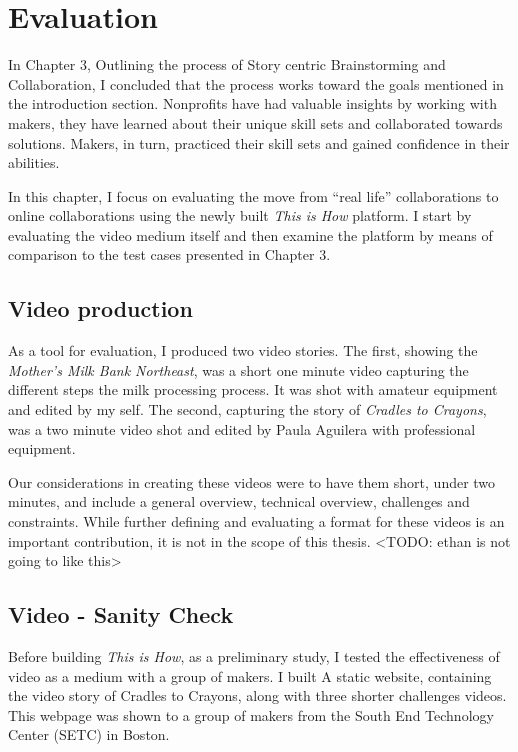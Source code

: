 \chapter{Evaluation}
\label{chap_eval}

In Chapter 3, Outlining the process of Story centric Brainstorming and Collaboration, I concluded that the process works toward the goals mentioned in the introduction section. Nonprofits have had valuable insights by working with makers, they have learned about their unique skill sets and collaborated towards solutions. Makers, in turn, practiced their skill sets and gained confidence in their abilities.

In this chapter, I focus on evaluating the move from ``real life'' collaborations to online collaborations using the newly built \textit{This is How} platform. I start by evaluating the video medium itself and then examine the platform by means of comparison to the test cases presented in Chapter 3.

\section{Video production} As a tool for evaluation, I produced two video stories. The first, showing the \textit{Mother's Milk Bank Northeast}, was a short one minute video capturing the different steps the milk processing process. It was shot with amateur equipment and edited by my self. The second, capturing the story of \textit{Cradles to Crayons}, was a two minute video shot and edited by Paula Aguilera with professional equipment. 

Our considerations in creating these videos were to have them short, under two minutes, and include a general overview, technical overview, challenges and constraints. While further defining and evaluating a format for these videos is an important contribution, it is not in the scope of this thesis. <TODO: ethan is not going to like this>

\section {Video - Sanity Check}

Before building \textit{This is How}, as a preliminary study, I tested the effectiveness of video as a medium with a group of makers. I built A static website, containing the video story of Cradles to Crayons, along with three shorter challenges videos. This webpage was shown to a group of makers from the South End Technology Center (SETC) in Boston.

